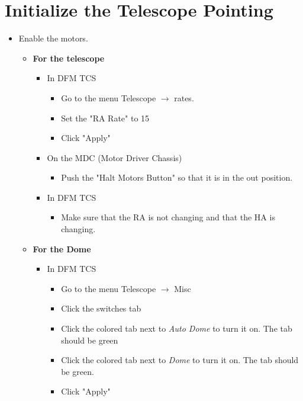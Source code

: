 \documentclass[letterpaper, 12pt]{report}
\begin{document}
\section{Initialize the Telescope Pointing}
\begin{itemize}
	\item Enable the motors. 
		\begin{itemize}
			\item \textbf{For the telescope}
			\begin{itemize}
				\item In DFM TCS
				\begin{itemize}
					\item Go to the menu Telescope $\rightarrow$ rates.
					\item Set the "RA Rate" to 15
					\item Click "Apply"
				\end{itemize}
				\item On the MDC (Motor Driver Chassis)
				\begin{itemize}
					\item Push the "Halt Motors Button" so that it is in the out position.
				\end{itemize}
				\end{itemize}
				\begin{itemize}
					\item In DFM TCS
					\begin{itemize}
						\item Make sure that the RA is not changing and that the HA is changing.
					\end{itemize}
				\end{itemize}
				\end{itemize}
				\begin{itemize}
					\item \textbf{For the Dome}
					\begin{itemize}
						\item In DFM TCS
						\begin{itemize}
							\item Go to the menu Telescope $\rightarrow$ Misc
							\item Click the switches tab
							\item Click the colored tab next to \emph{Auto Dome} to turn it on. The tab should be green
							\item Click the colored tab next to \emph{Dome} to turn it on. The tab should be green.
							\item Click "Apply"

\end{itemize}
\end{itemize}
\end{itemize}
\end{itemize}
\end{document}
